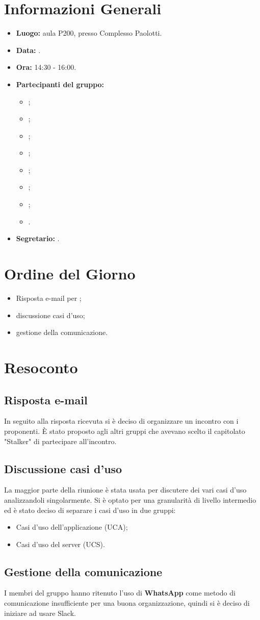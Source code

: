 \section{Informazioni Generali}
\begin{itemize}
\item \textbf{Luogo:} aula P200, presso Complesso Paolotti.
\item \textbf{Data:} \Data.
\item \textbf{Ora:} 14:30 - 16:00.
\item \textbf{Partecipanti del gruppo:}
	\begin{itemize}
		\item \AT{}; 
		\item \BR{};
		\item \CE{}; 
		\item \DF{};
		\item \LD{};
		\item \MC{};
		\item \PF{};
		\item \SE{}.
	\end{itemize} 
\item \textbf{Segretario:} \DF{}.
\end{itemize}


\section{Ordine del Giorno}
\begin{itemize}
\item Risposta e-mail per \Proponente{};
\item discussione casi d'uso;
\item gestione della comunicazione.
\end{itemize}

\section{Resoconto}
\subsection{Risposta e-mail \Proponente{}}
In seguito alla risposta ricevuta si è deciso di organizzare un incontro con i proponenti.
È stato proposto agli altri gruppi che avevano scelto il capitolato "Stalker" di partecipare all'incontro. 

\subsection{Discussione casi d'uso}
La maggior parte della riunione è stata usata per discutere dei vari casi d'uso analizzandoli singolarmente.
Si è optato per una granularità di livello intermedio ed è stato deciso di separare i casi d'uso in due gruppi:
\begin{itemize}
\item Casi d'uso dell'applicazione (UCA);
\item Casi d'uso del server (UCS).
\end{itemize}


\subsection{Gestione della comunicazione}
I membri del gruppo hanno ritenuto l'uso di \textbf{WhatsApp} come metodo di comunicazione insufficiente per una buona organizzazione, quindi si è deciso di iniziare ad usare Slack.

\clearpage
